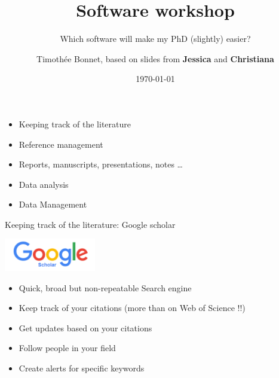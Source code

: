 \documentclass[10pt]{beamer}%
\title[Software workshop]{Software workshop}
\subtitle{Which software will make my PhD (slightly) easier?}
\date{\today}
\author[EE PhD retreat 2019]{Timoth\'ee Bonnet, based on slides from \textbf{Jessica} and \textbf{Christiana}}
\begin{document}
\begin{frame}
\maketitle
\end{frame} 

\begin{frame}{}
    \begin{itemize}
    \item Keeping track of the literature
    \item Reference management
    \item Reports, manuscripts, presentations, notes \dots
    \item Data analysis
    \item Data Management
        \end{itemize}

\end{frame}
\begin{frame}{Keeping track of the literature: Google scholar}

    \includegraphics[width=0.3\textwidth]{Figures/googlescholar}
    \begin{itemize}
   \item Quick, broad but non-repeatable Search engine
   \item Keep track of your citations (more than on Web of Science !!)
   \item Get updates based on your citations
   \item Follow people in your field
   \item Create alerts for specific keywords
 \end{itemize}

\end{frame}
\end{document}

